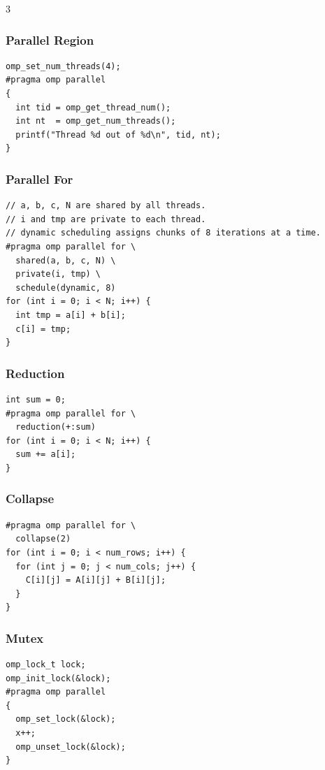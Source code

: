 \documentclass[12pt, a4paper]{article}
\begin{document}
\begin{multicols*}{3}
\vspace{-1em}
\colbreak
\subsubsection{Parallel Region}
\begin{lstlisting}[basicstyle=\ttfamily\scriptsize]
omp_set_num_threads(4);
#pragma omp parallel
{
  int tid = omp_get_thread_num();
  int nt  = omp_get_num_threads();
  printf("Thread %d out of %d\n", tid, nt);
}
\end{lstlisting}

\subsubsection{Parallel For}
\begin{lstlisting}[basicstyle=\ttfamily\scriptsize]
// a, b, c, N are shared by all threads.
// i and tmp are private to each thread.
// dynamic scheduling assigns chunks of 8 iterations at a time.
#pragma omp parallel for \ 
  shared(a, b, c, N) \ 
  private(i, tmp) \ 
  schedule(dynamic, 8)
for (int i = 0; i < N; i++) {
  int tmp = a[i] + b[i];
  c[i] = tmp;
}
\end{lstlisting}

\subsubsection{Reduction}
\begin{lstlisting}[basicstyle=\ttfamily\scriptsize]
int sum = 0;
#pragma omp parallel for \ 
  reduction(+:sum)
for (int i = 0; i < N; i++) {
  sum += a[i];
}
\end{lstlisting}

\subsubsection{Collapse}
\begin{lstlisting}[basicstyle=\ttfamily\scriptsize]
#pragma omp parallel for \ 
  collapse(2)
for (int i = 0; i < num_rows; i++) {
  for (int j = 0; j < num_cols; j++) {
    C[i][j] = A[i][j] + B[i][j];
  }
}
\end{lstlisting}

\subsubsection{Mutex}
\begin{lstlisting}[basicstyle=\ttfamily\scriptsize]
omp_lock_t lock;
omp_init_lock(&lock);
#pragma omp parallel
{
  omp_set_lock(&lock);
  x++;
  omp_unset_lock(&lock);
}
\end{lstlisting}


\end{multicols*}
\end{document}
